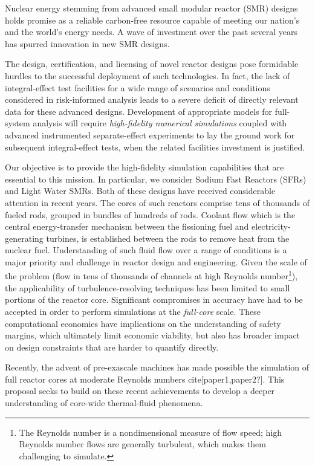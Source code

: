 Nuclear energy stemming from advanced small modular reactor (SMR) designs
holds promise as a reliable carbon-free resource capable of meeting our
nation's and the world's energy needs.  A wave of investment over the past
several years has spurred innovation in new SMR designs. 

The design, certification, and licensing of novel reactor designs pose
formidable hurdles to the successful deployment of such technologies. In fact,
the lack of integral-effect test facilities for a wide range of scenarios and
conditions considered in risk-informed analysis leads to a severe deficit of
directly relevant data for these advanced designs.  Development of  appropriate
models for full-system analysis will require {\em high-fidelity numerical
simulations} coupled with advanced instrumented separate-effect experiments to
lay the ground work for subsequent integral-effect tests, when the related
facilities investment is justified.

Our objective is to provide the high-fidelity simulation capabilities that are
essential to this mission.  In particular, we consider Sodium Fast Reactors
(SFRs) and Light Water SMRs. Both of these designs have received considerable
attention in recent years. The cores of such reactors comprise tens of
thousands of fueled rods, grouped in bundles of hundreds of rods. Coolant flow
which is the central energy-transfer mechanism between the fissioning fuel and
electricity-generating turbines, is established between the rods to remove heat
from the nuclear fuel.  Understanding of such fluid flow over a range of
conditions is a major priority and challenge in reactor design and engineering.
Given the scale of the problem (flow in tens of thousands of channels at high
Reynolds number\footnote{The Reynolds number is a nondimensional measure of flow
speed; high Reynolds number flows are generally turbulent, which makes them
challenging to simulate.}), the
applicability of turbulence-resolving techniques has been limited to small
portions of the reactor core. Significant compromises in accuracy have had to
be accepted in order to perform simulations at the {\em full-core} scale.
These computational economies have implications on the understanding of safety
margins, which ultimately limit economic viability, but also has broader impact
on design constraints that are harder to quantify directly.

Recently, the advent of pre-exascale machines has made possible the simulation
of full reactor cores at moderate Reynolds numbers cite[paper1,paper2?].  This
proposal seeks to build on these recent achievements to develop a deeper
understanding of core-wide thermal-fluid phenomena.

